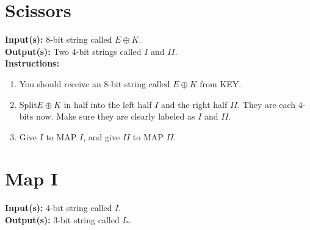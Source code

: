 \documentclass[12pt]{amsart}
\theoremstyle{plain}
\theoremstyle{definition}
\theoremstyle{remark}
\begin{document}
\newpage
\section*{Scissors}
\textbf{Input(s):}  8-bit string called $E\oplus K$.\\

\textbf{Output(s):} Two 4-bit strings called $I$ and $II$.\\

\textbf{Instructions:}
\begin{enumerate}[1.]
	\item You should receive an 8-bit string called  $E\oplus K$ from KEY.
	\item Split$E\oplus K$ in half into the left half $I$ and the right half $II$.  They are each 4-bits now.  Make sure they are clearly labeled as $I$ and $II$.
	\item Give $I$ to MAP $I$, and give $II$ to MAP $II$.
\end{enumerate}

\newpage
\section*{Map I}
\textbf{Input(s):}  4-bit string called $I$.\\

\textbf{Output(s):} 3-bit string called $I_*$.\\
\end{document}
